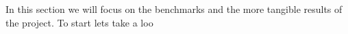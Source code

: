 In this section we will focus on the benchmarks
and the more tangible results of the project.
To start lets take a loo
